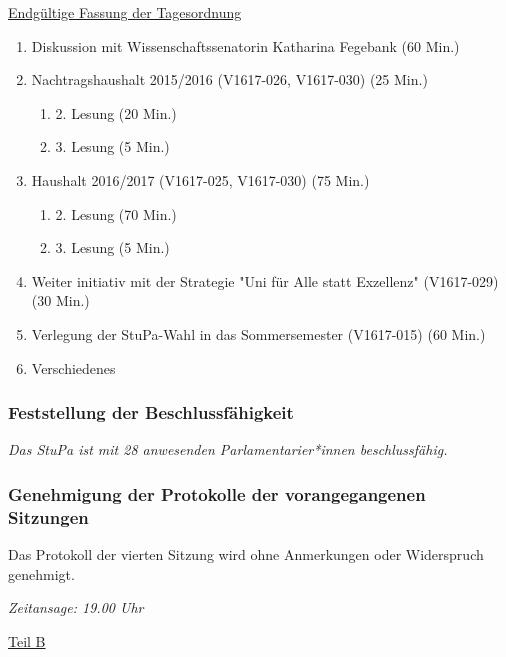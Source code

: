 \documentclass[ngerman,headheight=70pt]{scrartcl}
\begin{document}
    \underline{Endgültige Fassung der Tagesordnung}
    \begin{enumerate}[label={\textbf{Top \theenumi}},leftmargin=*]
        \item Diskussion mit Wissenschaftssenatorin Katharina Fegebank (60 Min.)
        \item Nachtragshaushalt 2015/2016 (V1617-026, V1617-030) (25 Min.)
        \begin{enumerate}
            \item 2. Lesung (20 Min.)
            \item 3. Lesung (5 Min.)
        \end{enumerate}
        \item Haushalt 2016/2017 (V1617-025, V1617-030) (75 Min.)
        \begin{enumerate}
            \item 2. Lesung (70 Min.)
            \item 3. Lesung (5 Min.)
        \end{enumerate}
        \item Weiter initiativ mit der Strategie "Uni für Alle statt Exzellenz" (V1617-029) (30 Min.)
        \item Verlegung der StuPa-Wahl in das Sommersemester (V1617-015) (60 Min.)
        \item Verschiedenes
    \end{enumerate}

    \subsubsection{Feststellung der Beschlussfähigkeit}

    \textit{Das StuPa ist mit 28 anwesenden Parlamentarier*innen beschlussfähig.}

    \subsubsection{Genehmigung der Protokolle der vorangegangenen Sitzungen}

    Das Protokoll der vierten Sitzung wird ohne Anmerkungen oder Widerspruch
    genehmigt.

    \textit{Zeitansage: 19.00 Uhr}

    \vspace{0.5cm}
    {\Large \underline{Teil B}}
\end{document}
